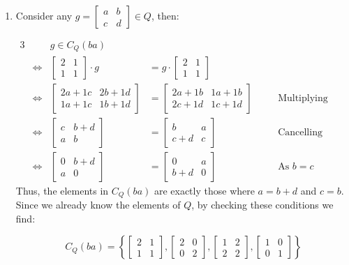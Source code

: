 \documentclass[a4paper, 11pt]{article}
\def\set#1{\left\{ #1 \right\}}
\begin{document}
\begin{enumerate}[label=(\alph*)]
	\item 
	Consider any $g=\begin{bmatrix}
		a & b\\
		c & d
	\end{bmatrix}\in Q$, then: 
	
	\begin{alignat*}{3}
		&& g\in C_Q(ba) \\
		&\iff&\begin{bmatrix}
			2 & 1 \\
			1 & 1 
		\end{bmatrix}\cdot g 
		&= g\cdot\begin{bmatrix}
			2 & 1 \\
			1 & 1 
		\end{bmatrix}\\
		&\iff & 
		\begin{bmatrix}
			2a + 1c & 2b + 1d \\
			1a + 1c & 1b + 1d 
		\end{bmatrix} &= 
		\begin{bmatrix}
			2a + 1b & 1a+1b \\ 
			2c + 1d & 1c+1d 
		\end{bmatrix} & \quad & \text{Multiplying Matrices}\\
		&\iff & 
		\begin{bmatrix}
			c & b + d \\
			a & b 
		\end{bmatrix} &= 
		\begin{bmatrix}
			b & a \\ 
			c + d & c
		\end{bmatrix} &\quad & \text{Cancelling}\\
		&\iff & 
		\begin{bmatrix}
			0 & b + d \\
			a & 0 
		\end{bmatrix} &= 
		\begin{bmatrix}
			0 & a \\ 
			b + d & 0
		\end{bmatrix} & \quad & \text{As $b=c$}
	\end{alignat*}
	Thus, the elements in $C_Q(ba)$ are exactly those where $a=b+d$ and $c=b$. Since we already know the elements of $Q$, by checking these conditions we find: 

	\[
		C_Q(ba) = \set{
			\begin{bmatrix}
				2 & 1 \\
				1 & 1
			\end{bmatrix},			
			\begin{bmatrix}
				2 & 0 \\
				0 & 2
			\end{bmatrix},
			\begin{bmatrix}
				1 & 2 \\
				2 & 2
			\end{bmatrix},
			\begin{bmatrix}
				1 & 0 \\
				0 & 1
			\end{bmatrix}
		}
	\]

\end{enumerate}
\end{document}

